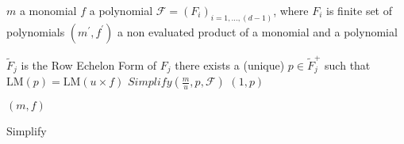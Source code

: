 \begin{algorithm}[ht]
  \begin{algorithmic}[1]
    \Require
      \Statex $m$ a monomial
      \Statex $f$ a polynomial
      \Statex $\mathcal{F} = (F_i)_{i=1,\ldots,(d-1)}$, where $F_i$ is finite set of polynomials
    \Ensure
      \Statex $(m^\prime, f^\prime)$ a non evaluated product of a monomial and a polynomial
      \Statex

        \State $\tilde{F}_j$ is the Row Echelon Form of $F_j$
        \State there exists a (unique) $p\in \tilde{F}^+_j$ such that $\textrm{LM}(p) = \textrm{LM}(u\times f)$
          \State \Return $Simplify(\frac{m}{u}, p, \mathcal{F})$
        \Else
          \State \Return $(1, p)$
        \EndIf
      \EndIf
    \EndFor

    \State \Return $(m, f)$

  \end{algorithmic}
  \caption{Simplify}
\end{algorithm}

